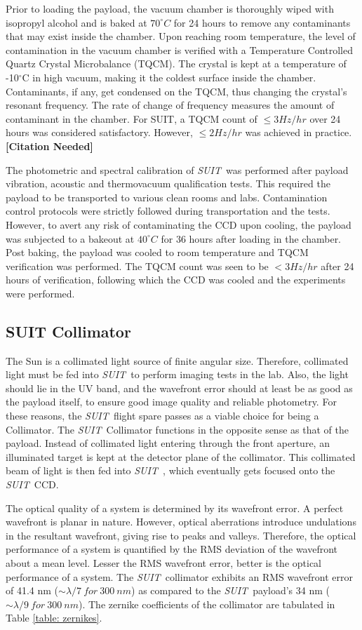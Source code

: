 \documentclass[12pt]{spieman}  %
\newcommand{\suit}{{\it SUIT~}}
\newcommand{\degree}{$^{\circ}$}
\newcommand{\js}[1]{{\bf\color{magenta} [#1]}}
\begin{document}
Prior to loading the payload, the vacuum chamber is thoroughly wiped with isopropyl alcohol and is baked at  $70^\circ C$ for 24 hours to remove any contaminants that may exist inside the chamber. Upon reaching room temperature, the level of contamination in the vacuum chamber is verified with a Temperature Controlled Quartz Crystal Microbalance (TQCM). The crystal is kept at a temperature of -10\degree C in high vacuum, making it the coldest surface inside the chamber. Contaminants, if any, get condensed on the TQCM, thus changing the crystal's resonant frequency. The rate of change of frequency measures the amount of contaminant in the chamber. For SUIT, a TQCM count of $\leq 3 Hz/hr$ over 24 hours was considered satisfactory. However, $\leq 2 Hz/hr$ was achieved in practice. \js{Citation Needed}

The photometric and spectral calibration of \suit was performed after payload vibration, acoustic and thermovacuum qualification tests. This required the payload to be transported to various clean rooms and labs. Contamination control protocols were strictly followed during transportation and the tests. However, to avert any risk of contaminating the CCD upon cooling, the payload was subjected to a bakeout at $40 ^\circ C$ for 36 hours after loading in the chamber. Post baking, the payload was cooled to room temperature and TQCM verification was performed. The TQCM count was seen to be $< 3 Hz/hr$ after 24 hours of verification, following which the CCD was cooled and the experiments were performed.
 
\subsection{SUIT Collimator}		
The Sun is a collimated light source of finite angular size. Therefore, collimated light must be fed into \suit to perform imaging tests in the lab. Also, the light should lie in the UV band, and the wavefront error should at least be as good as the payload itself, to ensure good image quality and reliable photometry. For these reasons, the \suit flight spare passes as a viable choice for being a Collimator.
The \suit Collimator functions in the opposite sense as that of the payload. Instead of collimated light entering through the front aperture, an illuminated target is kept at the  detector plane of the collimator. This collimated beam of light is then fed into \suit, which eventually gets focused onto the \suit CCD.

The optical quality of a system is determined by its wavefront error. A perfect wavefront is planar in nature. However, optical aberrations introduce undulations in the resultant wavefront, giving rise to peaks and valleys. Therefore, the optical performance of a system is quantified by the RMS deviation of the wavefront about a mean level. Lesser the RMS wavefront error, better is the optical performance of a system. The \suit collimator exhibits an RMS wavefront error of 41.4 nm ($\sim \lambda/7 ~ for ~ 300~ nm$) as compared to the \suit payload's 34 nm ($\sim \lambda/9 ~ for ~ 300~ nm$). The zernike coefficients of the collimator are tabulated in Table \ref{table: zernikes}.
\end{document}
